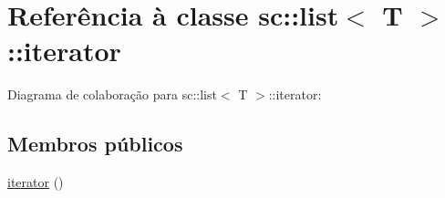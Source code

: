 \hypertarget{classsc_1_1list_1_1iterator}{}\section{Referência à classe sc\+:\+:list$<$ T $>$\+:\+:iterator}
\label{classsc_1_1list_1_1iterator}


Diagrama de colaboração para sc\+:\+:list$<$ T $>$\+:\+:iterator\+:
\subsection*{Membros públicos}
\begin{DoxyCompactItemize}
\item 
\hyperlink{classsc_1_1list_1_1iterator_acd90feec03d8a2762f36407a27166bb9}{iterator} ()\hypertarget{classsc_1_1list_1_1iterator_acd90feec03d8a2762f36407a27166bb9}{}\label{classsc_1_1list_1_1iterator_acd90feec03d8a2762f36407a27166bb9}


\end{DoxyCompactItemize}
